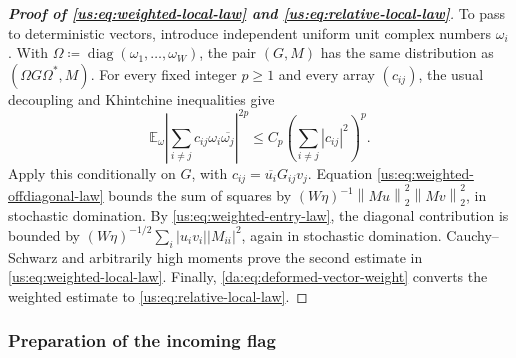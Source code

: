 \documentclass[11pt]{article}
\numberwithin{equation}{section}
\theoremstyle{remark}
\newcommand{\E}{\mathbb E}
\newcommand{\diag}{\operatorname{diag}}
\newcommand{\norm}[1]{\left\|#1\right\|}
\begin{document}
\begin{proof}[\textbf{Proof of \eqref{us:eq:weighted-local-law} and \eqref{us:eq:relative-local-law}}]
To pass to deterministic vectors, introduce independent uniform unit
complex numbers $\omega_i$. With
$\Omega\coloneqq\diag(\omega_1,\ldots,\omega_W)$, the pair $(G,M)$
has the same distribution as $(\Omega G\Omega^*,M)$.
For every fixed integer $p\ge1$ and every array $(c_{ij})$, the
usual decoupling and Khintchine inequalities give
\[
 \E_\omega\left|\sum_{i\ne j}c_{ij}\omega_i\overline{\omega_j}\right|^{2p}
 \le C_p\left(\sum_{i\ne j}|c_{ij}|^2\right)^p.
\]
Apply this conditionally on $G$, with $c_{ij}=\overline{u_i}G_{ij}v_j$.
Equation \eqref{us:eq:weighted-offdiagonal-law} bounds the sum of squares by
$(W\eta)^{-1}\norm{Mu}_2^2\norm{Mv}_2^2$, in stochastic domination.
By \eqref{us:eq:weighted-entry-law}, the diagonal contribution is bounded by
$(W\eta)^{-1/2}\sum_i|u_iv_i||M_{ii}|^2$, again in stochastic domination.
Cauchy--Schwarz and arbitrarily high moments prove the second estimate
in \eqref{us:eq:weighted-local-law}. Finally, \eqref{da:eq:deformed-vector-weight} converts the weighted
estimate to \eqref{us:eq:relative-local-law}.
\end{proof}

\subsubsection{Preparation of the incoming flag}
\label{su:sec:preparation}
\end{document}

